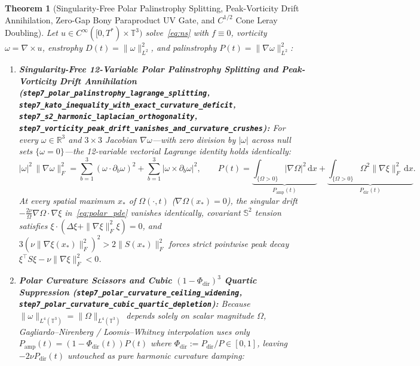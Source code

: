 \documentclass[11pt]{article}
\theoremstyle{plain}
\newtheorem{theorem}{Theorem}[section]
\theoremstyle{definition}
\begin{document}
\begin{theorem}[Singularity-Free Polar Palinstrophy Splitting, Peak-Vorticity Drift Annihilation, Zero-Gap Bony Paraproduct UV Gate, and $C^{1/2}$ Cone Leray Doubling]\label{thm:step7}
Let $u \in C^\infty([0,T^*)\times\mathbb{T}^3)$ solve~\eqref{eq:ns} with $f \equiv 0$, vorticity $\omega = \nabla\times u$, enstrophy $D(t) = \|\omega\|_{L^2}^2$, and palinstrophy $P(t) = \|\nabla\omega\|_{L^2}^2$:
\begin{enumerate}
  \item \textbf{Singularity-Free 12-Variable Polar Palinstrophy Splitting and Peak-Vorticity Drift Annihilation (\texttt{step7\_polar\_\allowbreak palinstrophy\_lagrange\_splitting}, \texttt{step7\_kato\_inequality\_\allowbreak with\_exact\_curvature\_deficit}, \texttt{step7\_s2\_harmonic\_\allowbreak laplacian\_orthogonality}, \texttt{step7\_vorticity\_\allowbreak peak\_drift\_vanishes\_and\_curvature\_crushes}):} For every $\omega \in \mathbb{R}^3$ and $3\times 3$ Jacobian $\nabla\omega$---with \emph{zero division by $|\omega|$ across null sets $\{\omega = 0\}$}---the 12-variable vectorial Lagrange identity holds identically:
  \begin{equation}\label{eq:polar_lagrange}
    |\omega|^2\,\|\nabla\omega\|_F^2 = \sum_{b=1}^3 (\omega \cdot \partial_b\omega)^2 + \sum_{b=1}^3 |\omega \times \partial_b\omega|^2, \qquad P(t) = \underbrace{\int_{\{\Omega>0\}} |\nabla\Omega|^2\,\mathrm{d}x}_{P_{\mathrm{amp}}(t)} + \underbrace{\int_{\{\Omega>0\}} \Omega^2\|\nabla\xi\|_F^2\,\mathrm{d}x}_{P_{\mathrm{dir}}(t)}.
  \end{equation}
  At every spatial maximum $x_*$ of $\Omega(\cdot,t)$ ($\nabla\Omega(x_*) = 0$), the singular drift $-\frac{2\nu}{\Omega}\nabla\Omega\cdot\nabla\xi$ in~\eqref{eq:polar_pde} vanishes identically, covariant $\mathbb{S}^2$ tension satisfies $\xi\cdot(\Delta\xi + \|\nabla\xi\|_F^2\xi) = 0$, and $3(\nu\|\nabla\xi(x_*)\|_F^2)^2 > 2\|S(x_*)\|_F^2$ forces strict pointwise peak decay $\xi^\top S\xi - \nu\|\nabla\xi\|_F^2 < 0$.
  \item \textbf{Polar Curvature Scissors and Cubic $(1 - \Phi_{\mathrm{dir}})^3$ Quartic Suppression (\texttt{step7\_polar\_\allowbreak curvature\_ceiling\_widening}, \texttt{step7\_polar\_curvature\_\allowbreak cubic\_quartic\_depletion}):} Because $\|\omega\|_{L^4(\mathbb{T}^3)} = \|\Omega\|_{L^4(\mathbb{T}^3)}$ depends solely on scalar magnitude $\Omega$, Gagliardo--Nirenberg / Loomis--Whitney interpolation uses \emph{only} $P_{\mathrm{amp}}(t) = (1 - \Phi_{\mathrm{dir}}(t))P(t)$ where $\Phi_{\mathrm{dir}} := P_{\mathrm{dir}}/P \in [0,1]$, leaving $-2\nu P_{\mathrm{dir}}(t)$ untouched as pure harmonic curvature damping:

\end{enumerate}
\end{theorem}
\end{document}
